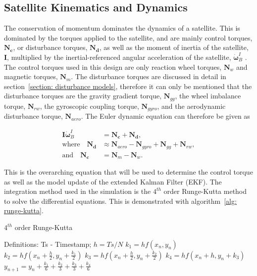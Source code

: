 \subsection{Satellite Kinematics and Dynamics}
The conservation of momentum dominates the dynamics of a satellite. This is dominated by the torques applied to the satellite, and are mainly control torques, $\mathbf{N_c}$, or disturbance torques, $\mathbf{N_d}$, as well as the moment of inertia of the satellite, $\mathbf{I}$, multiplied by the inertial-referenced angular acceleration of the satellite, $\boldsymbol{\dot{\omega}}_B^I$ . The control torques used in this design are only reaction wheel torques, $\mathbf{N}_w$ and magnetic torques, $\mathbf{N}_m$. The disturbance torques are discussed in detail in section~\ref{section: disturbance models}, therefore it can only be mentioned that the disturbance torques are the gravity gradient torque, $\mathbf{N}_{gg}$, the wheel imbalance torque, $\mathbf{N}_{rw}$, the gyroscopic coupling torque, $\mathbf{N}_{gyro}$, and the aerodynamic disturbance torque, $\mathbf{N}_{aero}$. The Euler dynamic equation can therefore be given as

\begin{equation}
\begin{aligned}
	\mathbf{I}\boldsymbol{\dot{\omega}}_B^I &= \mathbf{N_c} + \mathbf{N_d}, \\
	\text{where} \quad \mathbf{N_d} &\approx \mathbf{N}_{aero} - \mathbf{N}_{gyro} + \mathbf{N}_{gg} + \mathbf{N}_{rw}, \\
	\text{and} \quad \mathbf{N_c} &= \mathbf{N}_{m} - \mathbf{N}_{w}.
\end{aligned}
\end{equation}

This is the overarching equation that will be used to determine the control torque as well as the model update of the extended Kalman Filter (EKF). The integration method used in the simulation is the $4^{th}$ order Runge-Kutta method to solve the differential equations. This is demonstrated with algorithm~\ref{alg: runge-kutta}.

\begin{algorithm}[!htb]
	\caption[$4^{th}$ order Runge-Kutta]{$4^{th}$ order Runge-Kutta}
	\label{alg: runge-kutta}
	\begin{algorithmic}[1]
		\State Definitions: Ts - Timestamp; 
		\State $h = Ts/N$ 
		\State	$k_1 = hf(x_n, y_n)$
		\State	$k_2 = hf(x_n + \frac{h}{2}, y_n + \frac{k_1}{2})$
		\State	$k_3 = hf(x_n + \frac{h}{2}, y_n + \frac{k_2}{2})$
		\State	$k_4 = hf(x_n + h, y_n + k_3)$
		\State	$y_{n+1}=y_n + \frac{k_1}{6} + \frac{k_2}{3} + \frac{k_3}{3} + \frac{k_4}{6}$
		\EndFor

	\end{algorithmic}
\end{algorithm}

